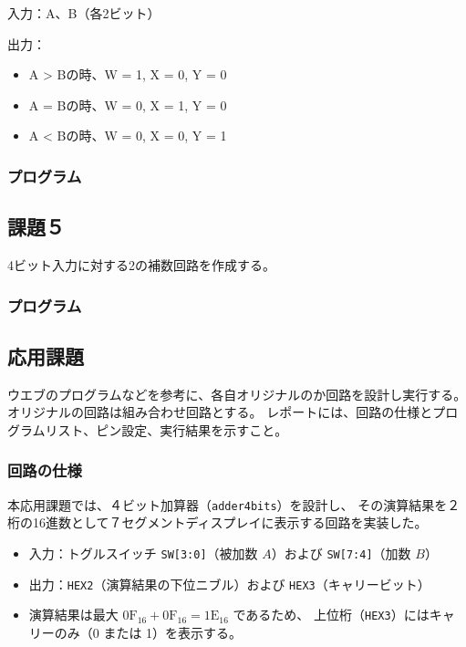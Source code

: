 \documentclass[12pt,a4paper]{ltjsarticle}
\begin{document}
入力：A、B（各2ビット）

出力：
\begin{itemize}
\item A > Bの時、W = 1, X = 0, Y = 0
\item A = Bの時、W = 0, X = 1, Y = 0
\item A < Bの時、W = 0, X = 0, Y = 1
\end{itemize}

\subsubsection{プログラム}


\subsection{課題５}
4ビット入力に対する2の補数回路を作成する。

\subsubsection{プログラム}


\subsection{応用課題}
ウエブのプログラムなどを参考に、各自オリジナルのか回路を設計し実行する。オリジナルの回路は組み合わせ回路とする。
レポートには、回路の仕様とプログラムリスト、ピン設定、実行結果を示すこと。

\subsubsection{回路の仕様}
本応用課題では、４ビット加算器（\texttt{adder4bits}）を設計し、
その演算結果を２桁の16進数として７セグメントディスプレイに表示する回路を実装した。
\begin{itemize}
  \item 入力：トグルスイッチ \texttt{SW[3:0]}（被加数 $A$）および \texttt{SW[7:4]}（加数 $B$）
  \item 出力：\texttt{HEX2}（演算結果の下位ニブル）および \texttt{HEX3}（キャリービット）
  \item 演算結果は最大 $\mathrm{0F}_{16}+\mathrm{0F}_{16}=\mathrm{1E}_{16}$ であるため、
        上位桁（\texttt{HEX3}）にはキャリーのみ（0 または 1）を表示する。
\end{itemize}
\end{document}
